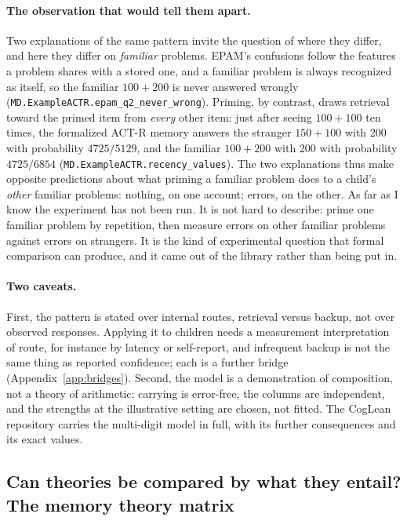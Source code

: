 \documentclass[11pt]{article}
\newcommand{\lean}[1]{\texttt{#1}}
\begin{document}
\paragraph{The observation that would tell them apart.} Two
explanations of the same pattern invite the question of where they
differ, and here they differ on \emph{familiar} problems. EPAM's
confusions follow the features a problem shares with a stored one, and
a familiar problem is always recognized as itself, so the familiar
$100+200$ is never answered wrongly (\lean{MD.ExampleACTR.epam\_q2\_never\_wrong}).
Priming, by contrast, draws retrieval toward the primed item from
\emph{every} other item: just after seeing $100+100$ ten times, the
formalized ACT-R memory answers the stranger $150+100$ with 200 with
probability $4725/5129$, and the familiar $100+200$ with 200 with
probability $4725/6854$ (\lean{MD.ExampleACTR.recency\_values}). The
two explanations thus make opposite predictions about what priming a
familiar problem does to a child's \emph{other} familiar problems:
nothing, on one account; errors, on the other. As far as I know the
experiment has not been run. It is not hard to describe: prime one
familiar problem by repetition, then measure errors on other familiar
problems against errors on strangers. It is the kind of experimental
question that formal comparison can produce, and it came out of the
library rather than being put in.

\paragraph{Two caveats.} First, the pattern is stated over internal
routes, retrieval versus backup, not over observed responses. Applying
it to children needs a measurement interpretation of route, for
instance by latency or self-report, and infrequent backup is not the
same thing as reported confidence; each is a further bridge
(Appendix~\ref{app:bridges}). Second, the model is a demonstration of
composition, not a theory of arithmetic: carrying is error-free, the
columns are independent, and the strengths at the illustrative setting
are chosen, not fitted. The CogLean repository \citep{coglean} carries
the multi-digit model in full, with its further consequences and its
exact values.

\subsection{Can theories be compared by what they entail? The memory theory matrix}
\label{sec:matrix}
\end{document}
